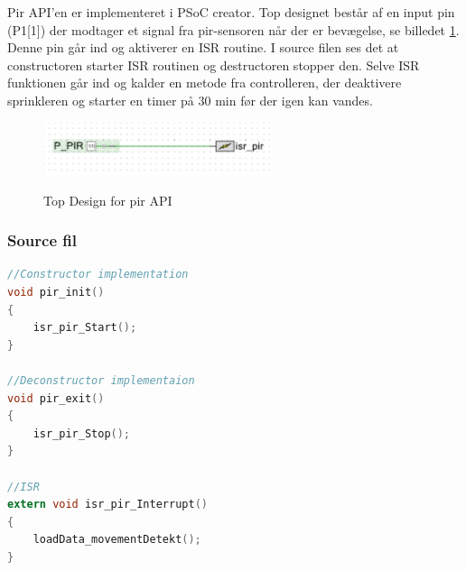 Pir API'en er implementeret i PSoC creator. Top designet består af en input pin (P1[1]) der modtager et signal fra pir-sensoren når der er bevægelse, se billedet \ref{lab:pir_topdesing}. Denne pin går ind og aktiverer en ISR routine. I source filen ses det at constructoren starter ISR routinen og destructoren stopper den. Selve ISR funktionen går ind og kalder en metode fra controlleren, der deaktivere sprinkleren og starter en timer på 30 min før der igen kan vandes.   

\begin{figure}[htb]
\centering
{\includegraphics[width=0.60\textwidth]{filer/pics/pir_api_topdesign}}
\caption{Top Design for pir API}
\label{lab:pir_topdesing}
\end{figure}

\subsubsection*{Source fil}

\begin{lstlisting}[language=C]
//Constructor implementation
void pir_init()
{
    isr_pir_Start();
}

//Deconstructor implementaion
void pir_exit()
{
    isr_pir_Stop();
}

//ISR
extern void isr_pir_Interrupt()
{  
    loadData_movementDetekt();   
}
\end{lstlisting}